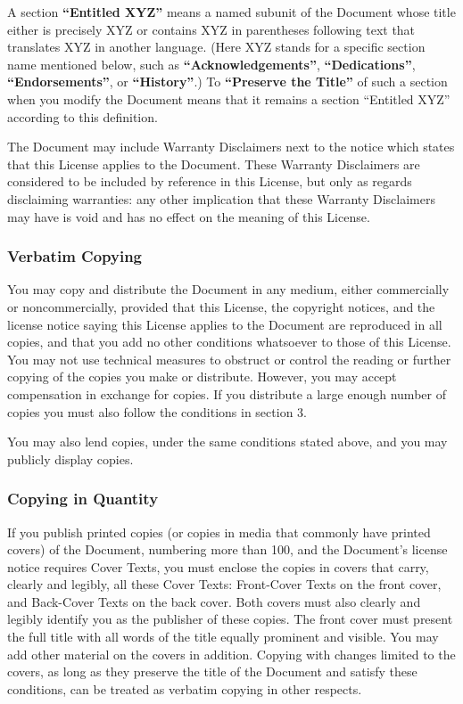 A section \textbf{``Entitled XYZ''} means a named subunit of the Document whose title either is precisely XYZ or contains XYZ in parentheses following text that translates XYZ in another language. (Here XYZ stands for a specific section name mentioned below, such as \textbf{``Acknowledgements''}, \textbf{``Dedications''}, \textbf{``Endorsements''}, or \textbf{``History''}.) To \textbf{``Preserve the Title''} of such a section when you modify the Document means that it remains a section ``Entitled XYZ'' according to this definition.

The Document may include Warranty Disclaimers next to the notice which states that this License applies to the Document. These Warranty Disclaimers are considered to be included by reference in this License, but only as regards disclaiming warranties: any other implication that these Warranty Disclaimers may have is void and has no effect on the meaning of this License.

\subsubsection{Verbatim Copying}

You may copy and distribute the Document in any medium, either commercially or noncommercially, provided that this License, the copyright notices, and the license notice saying this License applies to the Document are reproduced in all copies, and that you add no other conditions whatsoever to those of this License. You may not use technical measures to obstruct or control the reading or further copying of the copies you make or distribute. However, you may accept compensation in exchange for copies. If you distribute a large enough number of copies you must also follow the conditions in section 3.

You may also lend copies, under the same conditions stated above, and you may publicly display copies.

\subsubsection{Copying in Quantity}

If you publish printed copies (or copies in media that commonly have printed covers) of the Document, numbering more than 100, and the Document's license notice requires Cover Texts, you must enclose the copies in covers that carry, clearly and legibly, all these Cover Texts: Front-Cover Texts on the front cover, and Back-Cover Texts on the back cover. Both covers must also clearly and legibly identify you as the publisher of these copies. The front cover must present the full title with all words of the title equally prominent and visible. You may add other material on the covers in addition. Copying with changes limited to the covers, as long as they preserve the title of the Document and satisfy these conditions, can be treated as verbatim copying in other respects.

